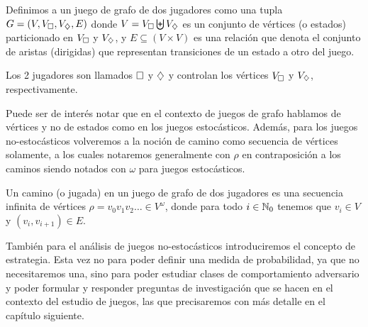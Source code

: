 
\begin{definition}
	Definimos a un juego de grafo de dos jugadores como una tupla $G = (V, V_\square,V_\diamondsuit, E)$ donde $V = V_\square \biguplus V_\diamondsuit$ es un conjunto de vértices (o estados) particionado en $V_\square$ y $V_\diamondsuit$, y $E \subseteq (V\times V)$ es una relación que denota el conjunto de aristas (dirigidas) que representan transiciones de un estado a otro del juego.

	Los 2 jugadores son llamados $\square$ y $\diamondsuit$ y controlan los vértices
	$V_\square$ y $V_\diamondsuit$, respectivamente.
\end{definition}

Puede ser de interés notar que en el contexto de juegos de grafo hablamos de
vértices y no de estados como en los juegos estocásticos. Además, para los
juegos no-estocásticos volveremos a la noción de camino como secuencia de
vértices solamente, a los cuales notaremos generalmente con $\rho$ en
contraposición a los caminos siendo notados con $\omega$ para juegos
estocásticos.

\begin{definition}
	Un camino (o jugada) en un juego de grafo de dos jugadores es una secuencia infinita de vértices $\rho = v_0v_1v_2 \dots \in V^\omega$, donde para todo $i \in \mathbb{N}_0$ tenemos que $v_i \in V$ y $(v_i, v_{i+1}) \in E$.

\end{definition}

También para el análisis de juegos no-estocásticos introduciremos el concepto
de estrategia. Esta vez no para poder definir una medida de probabilidad, ya
que no necesitaremos una, sino para poder estudiar clases de comportamiento
adversario y poder formular y responder preguntas de investigación que se hacen
en el contexto del estudio de juegos, las que precisaremos con más detalle en
el capítulo siguiente.


